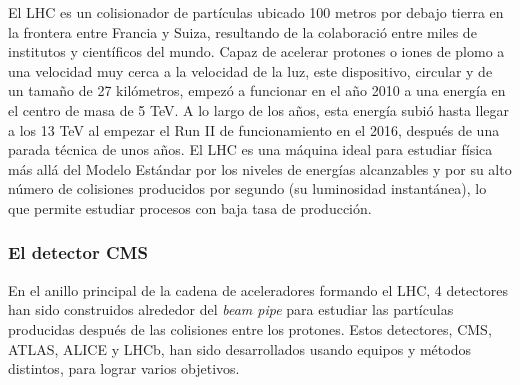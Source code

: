 \documentclass[a4paper, 10pt, openright]{report}
\begin{document}
\begin{appendices}
El \ac{LHC} es un colisionador de part\'{i}culas ubicado 100 metros por debajo tierra en la frontera entre Francia y Suiza, resultando de la colaboraci\'{o} entre miles de institutos y cient\'{i}ficos del mundo. Capaz de acelerar protones o iones de plomo a una velocidad muy cerca a la velocidad de la luz, este dispositivo, circular y de un tama\~{n}o de 27 kil\'{o}metros, empez\'{o} a funcionar en el a\~{n}o 2010 a una energ\'{i}a en el centro de masa de 5 TeV. A lo largo de los a\~{n}os, esta energ\'{i}a subi\'{o} hasta llegar a los 13 TeV al empezar el Run II de funcionamiento en el 2016, despu\'{e}s de una parada t\'{e}cnica de unos a\~{n}os. El \ac{LHC} es una m\'{a}quina ideal para estudiar f\'{i}sica m\'{a}s all\'{a} del Modelo Est\'{a}ndar por los niveles de energ\'{i}as alcanzables y por su alto n\'{u}mero de colisiones producidos por segundo (su luminosidad instant\'{a}nea), lo que permite estudiar procesos con baja tasa de producci\'{o}n.

\subsubsection{El detector CMS}

En el anillo principal de la cadena de aceleradores formando el \ac{LHC}, 4 detectores han sido construidos alrededor del \textit{beam pipe} para estudiar las part\'{i}culas producidas despu\'{e}s de las colisiones entre los protones. Estos detectores, \ac{CMS}, \ac{ATLAS}, \ac{ALICE} y LHCb, han sido desarrollados usando equipos y m\'{e}todos distintos, para lograr varios objetivos. 


\end{appendices}
\end{document}
